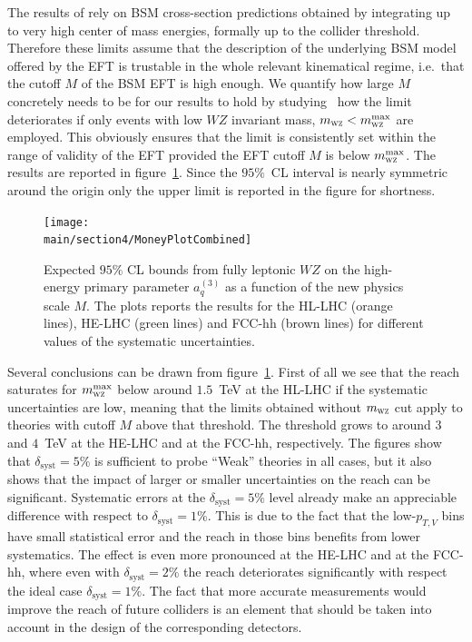 \documentclass[../report.tex]{subfiles}
\providecommand{\main}{..}
\begin{document}
The results of   rely on BSM cross-section predictions obtained by integrating up to very high center of mass energies, formally up to the collider threshold. Therefore these limits assume that the description of the underlying BSM model offered by the EFT is trustable in the whole relevant kinematical regime, i.e.~that the cutoff $M$ of the BSM EFT is high enough. We quantify how large $M$ concretely needs to be for our results to hold by studying~\cite{Racco:2015dxa,Pobbe:2017wrj,Biekoetter:2014jwa} how the limit deteriorates if only events with low $WZ$ invariant mass, $m_{\textsc{wz}}<m_{\textsc{wz}}^{\rm{max}}$ are employed. This obviously ensures that the limit is consistently set within the range of validity of the EFT provided the EFT cutoff $M$ is below $m_{\textsc{wz}}^{\rm{max}}$. The results are reported in figure~\ref{fig:bounds_future}. Since the $95\%$~CL interval is nearly symmetric around the origin only the upper limit is reported in the figure for shortness.

\begin{figure}[t]
\centering
\texttt{[image: \\main/section4/MoneyPlotCombined]}
\caption{Expected $95\%$ CL bounds from fully leptonic $WZ$ on the high-energy primary parameter $a^{(3)}_q$ as a function of the new physics scale $M$. The plots reports the results for the HL-LHC (orange lines), HE-LHC (green lines) and FCC-hh (brown lines) for different
values of the systematic uncertainties.} 
\label{fig:bounds_future}
\end{figure}

Several conclusions can be drawn from figure~\ref{fig:bounds_future}. First of all we see that the reach saturates for $m_{\textsc{wz}}^{\rm{max}}$ below around $1.5$~TeV at the HL-LHC if the systematic uncertainties are low, meaning that the limits obtained without $m_{\textsc{wz}}$ cut apply to theories with cutoff $M$ above that threshold.  The threshold grows to around $3$ and $4$~TeV at the HE-LHC and at the FCC-hh, respectively. The figures show that $\delta_{\textrm{syst}}=5\%$ is sufficient to probe ``Weak'' theories in all cases, but it also shows that the impact of larger or smaller uncertainties on the reach can be significant. Systematic errors at the $\delta_{\textrm{syst}}=5\%$ level already make an appreciable difference with respect to $\delta_{\textrm{syst}}=1\%$. This is due to the fact that the low-$p_{T,V}$ bins have small statistical error and the reach in those bins benefits from lower systematics. The effect is even more pronounced at the HE-LHC and at the FCC-hh, where even with $\delta_{\textrm{syst}}=2\%$ the reach deteriorates significantly with respect the ideal case $\delta_{\textrm{syst}}=1\%$. The fact that more accurate measurements would improve the reach of future colliders is an element that should be taken into account in the design of the corresponding detectors.
\end{document}
